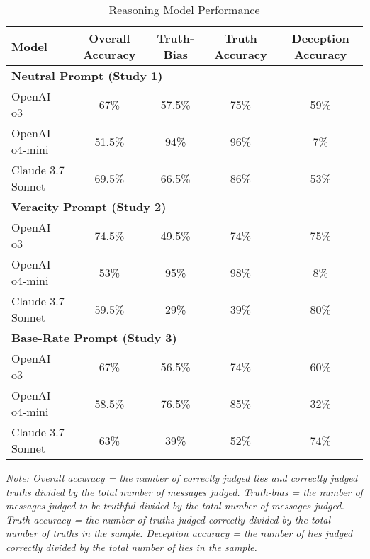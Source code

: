 \documentclass{article}
\begin{document}
\begin{table}[ht]
\centering
\caption{Reasoning Model Performance}
\begin{tabular}{lcccc}
\toprule
\textbf{Model} & \textbf{Overall Accuracy} & \textbf{Truth-Bias} & \textbf{Truth Accuracy} & \textbf{Deception Accuracy} \\
\midrule
\multicolumn{5}{l}{\textbf{Neutral Prompt (Study 1)}} \\
OpenAI o3 & 67\% & 57.5\% & 75\% & 59\% \\
OpenAI o4-mini & 51.5\% & 94\% & 96\% & 7\% \\
Claude 3.7 Sonnet & 69.5\% & 66.5\% & 86\% & 53\% \\
\midrule
\multicolumn{5}{l}{\textbf{Veracity Prompt (Study 2)}} \\
OpenAI o3 & 74.5\% & 49.5\% & 74\% & 75\% \\
OpenAI o4-mini & 53\% & 95\% & 98\% & 8\% \\
Claude 3.7 Sonnet & 59.5\% & 29\% & 39\% & 80\% \\
\midrule
\multicolumn{5}{l}{\textbf{Base-Rate Prompt (Study 3)}} \\
OpenAI o3 & 67\% & 56.5\% & 74\% & 60\% \\
OpenAI o4-mini & 58.5\% & 76.5\% & 85\% & 32\% \\
Claude 3.7 Sonnet & 63\% & 39\% & 52\% & 74\% \\
\bottomrule
\end{tabular}
\label{tab:model_performance}
\footnotetext{}
\parbox[t]{\linewidth}{\footnotesize \textit{Note: Overall accuracy = the number of correctly judged lies and correctly judged truths divided by the total number of messages judged. Truth-bias = the number of messages judged to be truthful divided by the total number of messages judged. Truth accuracy = the number of truths judged correctly divided by the total number of truths in the sample. Deception accuracy = the number of lies judged correctly divided by the total number of lies in the sample.}}
\end{table}
\end{document}
